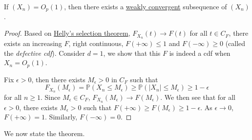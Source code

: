 \begin{theorem}\label{thm:Prokhorov}
	If \((X_n) = O_p(1)\), then there exists a \hyperref[def:converge-weakly]{weakly convergent} subsequence of \((X_n)\).
\end{theorem}
\begin{proof}%
	Based on \href{https://en.wikipedia.org/wiki/Helly%27s_selection_theorem}{Helly's selection theorem}, \(F_{X_n}(t) \to F(t)\) for all \(t \in C_F\), there exists an increasing \(F\), right continuous, \(F(+\infty ) \leq 1\) and \(F(-\infty ) \geq 0\) (called the \emph{defective cdf}). Consider \(d = 1\), we show that this \(F\) is indeed a cdf when \(X_n = O_p(1)\).

	Fix \(\epsilon > 0\), then there exists \(M_{\epsilon } > 0\) in \(C_F\) such that
	\[
		F_{X_n}(M_{\epsilon } )
		=\mathbb{P} (X_n \leq M_{\epsilon } )
		\geq \mathbb{P} (\vert X_n \vert \leq M_{\epsilon } )
		\geq 1 - \epsilon
	\]
	for all \(n \geq 1\). Since \(M_{\epsilon } \in C_F\), \(F_{X_n}(M_{\epsilon } ) \to F(M_{\epsilon } )\). We then see that for all \(\epsilon > 0\), there exists \(M_{\epsilon } > 0 \) such that \(F(+\infty ) \geq F(M_{\epsilon } ) \geq 1 - \epsilon \). As \(\epsilon \to 0\), \(F(+\infty ) = 1\). Similarly, \(F(-\infty ) = 0\).
\end{proof}

We now state the theorem.

